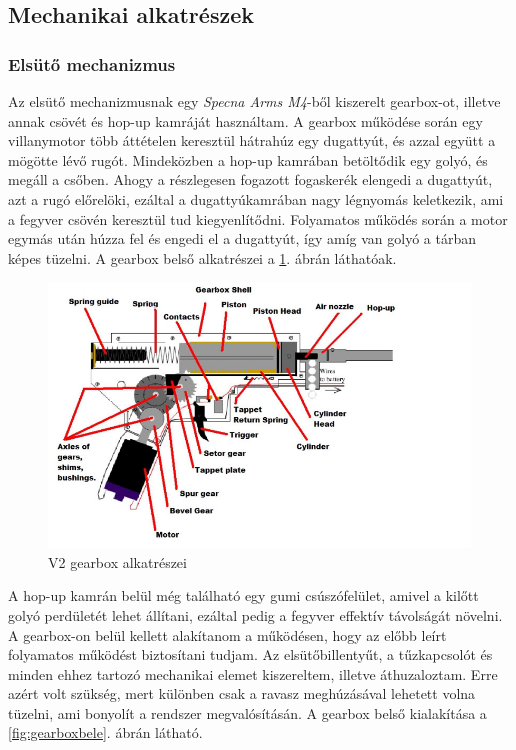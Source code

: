 \documentclass[12pt,a4paper]{article}
\begin{document}
\subsection{Mechanikai alkatrészek}
\subsubsection*{Elsütő mechanizmus}
Az elsütő mechanizmusnak egy \textsl{Specna Arms M4}-ből kiszerelt gearbox-ot, illetve annak csövét és hop-up kamráját használtam. A gearbox működése során egy villanymotor több áttételen keresztül hátrahúz egy dugattyút, és azzal együtt a mögötte lévő rugót. Mindeközben a hop-up kamrában betöltődik egy golyó, és megáll a csőben. Ahogy a részlegesen fogazott fogaskerék elengedi a dugattyút, azt a rugó előrelöki, ezáltal a dugattyúkamrában nagy légnyomás keletkezik, ami a fegyver csövén keresztül tud kiegyenlítődni. Folyamatos működés során a motor egymás után húzza fel és engedi el a dugattyút, így amíg van golyó a tárban képes tüzelni. A gearbox belső alkatrészei a \ref{fig:mech_gearboxdiagram}. ábrán láthatóak. 

\begin{figure}[h!]
	\centering
	\includegraphics[width=1\linewidth]{mech_gearboxdiagram}
	\caption{V2 gearbox alkatrészei \cite{airsoft}}
	\label{fig:mech_gearboxdiagram}
\end{figure}

A hop-up kamrán belül még található egy gumi csúszófelület, amivel a kilőtt golyó perdületét lehet állítani, ezáltal pedig a fegyver effektív távolságát növelni.\\

A gearbox-on belül kellett alakítanom a működésen, hogy az előbb leírt folyamatos működést biztosítani tudjam.  Az elsütőbillentyűt, a tűzkapcsolót és minden ehhez tartozó mechanikai elemet kiszereltem, illetve áthuzaloztam. Erre azért volt szükség, mert különben csak a ravasz meghúzásával lehetett volna tüzelni, ami bonyolít a rendszer megvalósításán. A gearbox belső kialakítása a \ref{fig:gearboxbele}. ábrán látható.
\end{document}
